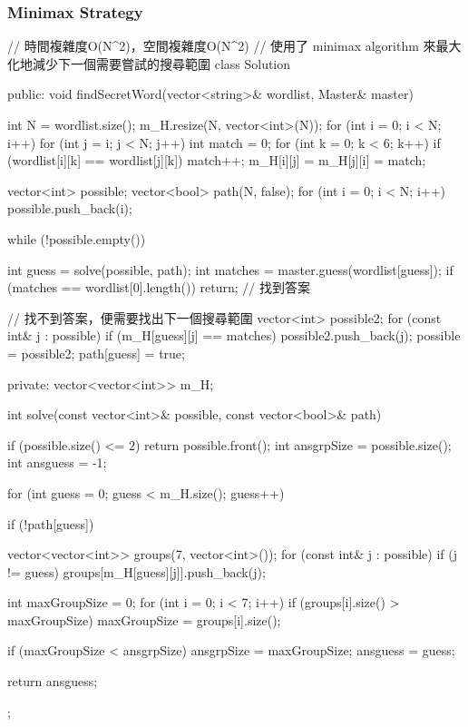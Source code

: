 \subsubsection{Minimax Strategy}
\begin{Code}
// 時間複雜度O(N^2)，空間複雜度O(N^2)
// 使用了 minimax algorithm 來最大化地減少下一個需要嘗試的搜尋範圍
class Solution {
public:
    void findSecretWord(vector<string>& wordlist, Master& master) {
        int N = wordlist.size();
        m_H.resize(N, vector<int>(N));
        for (int i = 0; i < N; i++)
        {
            for (int j = i; j < N; j++)
            {
                int match = 0;
                for (int k = 0; k < 6; k++)
                {
                    if (wordlist[i][k] == wordlist[j][k])
                        match++;
                }
                m_H[i][j] = m_H[j][i] = match;
            }
        }

        vector<int> possible;
        vector<bool> path(N, false);
        for (int i = 0; i < N; i++) possible.push_back(i);

        while (!possible.empty())
        {
            int guess = solve(possible, path);
            int matches = master.guess(wordlist[guess]);
            if (matches == wordlist[0].length()) return; // 找到答案

            // 找不到答案，便需要找出下一個搜尋範圍
            vector<int> possible2;
            for (const int& j : possible)
                if (m_H[guess][j] == matches) possible2.push_back(j);
            possible = possible2;
            path[guess] = true;
        }
    }
private:
    vector<vector<int>> m_H;

    int solve(const vector<int>& possible, const vector<bool>& path)
    {
        if (possible.size() <= 2) return possible.front();
        int ansgrpSize = possible.size();
        int ansguess = -1;

        for (int guess = 0; guess < m_H.size(); guess++)
        {
            if (!path[guess])
            {
                vector<vector<int>> groups(7, vector<int>());
                for (const int& j : possible)
                {
                    if (j != guess)
                        groups[m_H[guess][j]].push_back(j);
                }

                int maxGroupSize = 0;
                for (int i = 0; i < 7; i++)
                {
                    if (groups[i].size() > maxGroupSize)
                        maxGroupSize = groups[i].size();
                }

                if (maxGroupSize < ansgrpSize)
                {
                    ansgrpSize = maxGroupSize;
                    ansguess = guess;
                }
            }
        }

        return ansguess;
    }
};
\end{Code}

